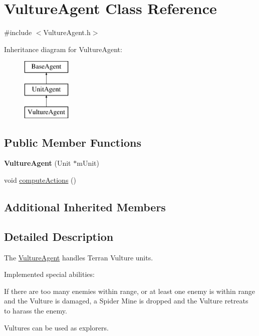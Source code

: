 \hypertarget{class_vulture_agent}{\section{Vulture\-Agent Class Reference}
\label{class_vulture_agent}
}


{\ttfamily \#include $<$Vulture\-Agent.\-h$>$}

Inheritance diagram for Vulture\-Agent\-:\begin{figure}[H]
\begin{center}
\leavevmode
\includegraphics[height=3.000000cm]{class_vulture_agent}
\end{center}
\end{figure}
\subsection*{Public Member Functions}
\begin{DoxyCompactItemize}
\item 
\hypertarget{class_vulture_agent_a899360e2bd88390a089f6a66e967f82f}{{\bfseries Vulture\-Agent} (Unit $\ast$m\-Unit)}\label{class_vulture_agent_a899360e2bd88390a089f6a66e967f82f}

\item 
void \hyperlink{class_vulture_agent_a3ebe87b78ef090c6baf3dbd094cf4aeb}{compute\-Actions} ()
\end{DoxyCompactItemize}
\subsection*{Additional Inherited Members}


\subsection{Detailed Description}
The \hyperlink{class_vulture_agent}{Vulture\-Agent} handles Terran Vulture units.

Implemented special abilities\-:
\begin{DoxyItemize}
\item If there are too many enemies within range, or at least one enemy is within range and the Vulture is damaged, a Spider Mine is dropped and the Vulture retreats to harass the enemy.
\item Vultures can be used as explorers.
\end{DoxyItemize}

